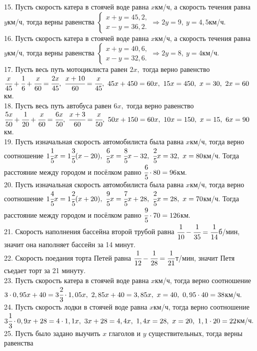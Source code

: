 \documentclass[12pt]{article}
\begin{document}
15. Пусть скорость катера в стоячей воде равна $x$км/ч, а скорость течения равна $y$км/ч, тогда верны равенства $\begin{cases} x+y=45,2,\\ x-y=36,2.\end{cases}
\Rightarrow 2y=9,\ y=4,5$км/ч.\\
16. Пусть скорость катера в стоячей воде равна $x$км/ч, а скорость течения равна $y$км/ч, тогда верны равенства $\begin{cases} x+y=40,6,\\ x-y=32,6.\end{cases}
\Rightarrow 2y=8,\ y=4$км/ч.\\
17. Пусть весь путь мотоциклиста равен $2x,$ тогда верно равенство $\cfrac{x}{45}+\cfrac{1}{6}+\cfrac{x}{60}=\cfrac{2x}{45},\
\cfrac{x+10}{60}=\cfrac{x}{45},\ 45x+450=60x,\ 15x=450,\ x=30,\ 2x=60$км.\\
18. Пусть весь путь автобуса равен $6x,$ тогда верно равенство $\cfrac{5x}{50}+\cfrac{1}{20}+\cfrac{x}{60}=\cfrac{6x}{50},\
\cfrac{x+3}{60}=\cfrac{x}{50},\ 50x+150=60x,\ 10x=150,\ x=15,\ 6x=90$км.\\
19. Пусть изначальная скорость автомобилиста была равна $x$км/ч, тогда верно соотношение $1\cfrac{1}{5}x=1\cfrac{3}{5}(x-20),\ \cfrac{6}{5}x=\cfrac{8}{5}x-32,\
\cfrac{2}{5}x=32,\ x=80$км/ч. Тогда расстояние между городом и посёлком равно $\cfrac{6}{5}\cdot80=96$км.\\
20. Пусть изначальная скорость автомобилиста была равна $x$км/ч, тогда верно соотношение $1\cfrac{4}{5}x=1\cfrac{2}{5}(x+20),\ \cfrac{9}{5}x=\cfrac{7}{5}x+28,\
\cfrac{2}{5}x=28,\ x=70$км/ч. Тогда расстояние между городом и посёлком равно $\cfrac{9}{5}\cdot70=126$км.\\
21. Скорость наполнения бассейна второй трубой равна $\cfrac{1}{10}-\cfrac{1}{35}=\cfrac{1}{14}$б/мин, значит она наполняет бассейн за 14 минут.\\
22. Скорость поедания торта Петей равна $\cfrac{1}{12}-\cfrac{1}{28}=\cfrac{1}{21}$т/мин, значит Петя съедает торт за 21 минуту.\\
23. Пусть скорость катера в стоячей воде равна $x$км/ч, тогда верно соотношение $3\cdot0,95x+40=3\cfrac{2}{3}\cdot1,05x,\
2,85x+40=3,85x,\ x=40,\ 0,95\cdot40=38$км/ч.\\
24. Пусть скорость лодки в стоячей воде равна $x$км/ч, тогда верно соотношение $3\cfrac{1}{3}\cdot0,9x+28=4\cdot1,1x,\
3x+28=4,4x,\ 1,4x=28,\ x=20,\ 1,1\cdot20=22$км/ч.\\
25. Пусть было задано выучить $x$ глаголов и $y$ существительных, тогда верны равенства\\
\end{document}
